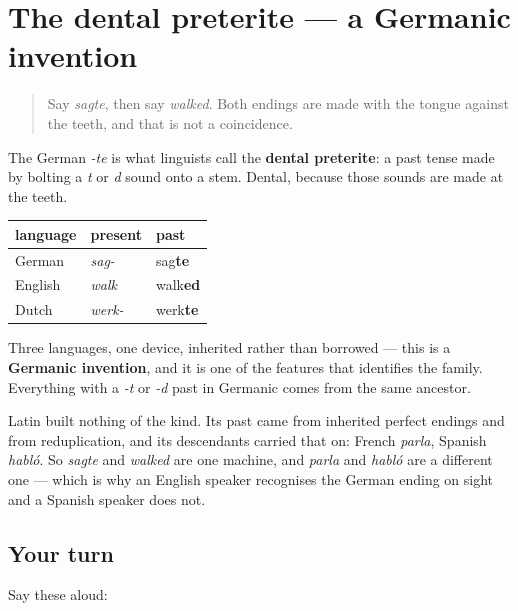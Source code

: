 \section[das dentale Präteritum]{The dental preterite — a Germanic invention}

\label{lesson:GE-C15-dentales-praeteritum}



\begin{quote}
Say \emph{sagte}, then say \emph{walked}. Both endings are made with the tongue against the teeth, and that is not a coincidence.
\end{quote}

\begin{cousinweb}
The German \emph{-te} is what linguists call the \textbf{dental preterite}: a past tense made by bolting a \emph{t} or \emph{d} sound onto a stem. Dental, because those sounds are made at the teeth.

\noindent
\begin{tabularx}{\linewidth}{@{}>{\raggedright\arraybackslash}X>{\raggedright\arraybackslash}X>{\raggedright\arraybackslash}X@{}}
\toprule
\textbf{language} & \textbf{present} & \textbf{past} \\
\midrule
German & \emph{sag-} & sag\textbf{te} \\
English & \emph{walk} & walk\textbf{ed} \\
Dutch & \emph{werk-} & werk\textbf{te} \\
\bottomrule
\end{tabularx}

Three languages, one device, inherited rather than borrowed — this is a \textbf{Germanic invention}, and it is one of the features that identifies the family. Everything with a \emph{-t} or \emph{-d} past in Germanic comes from the same ancestor.

Latin built nothing of the kind. Its past came from inherited perfect endings and from reduplication, and its descendants carried that on: French \emph{parla}, Spanish \emph{habló}. So \emph{sagte} and \emph{walked} are one machine, and \emph{parla} and \emph{habló} are a different one — which is why an English speaker recognises the German ending on sight and a Spanish speaker does not.
\end{cousinweb}

\subsection*{Your turn}
Say these aloud:

